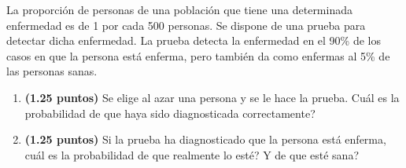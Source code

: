 
La proporción de personas de una población que tiene una determinada enfermedad es de 1 por cada 500 personas. Se dispone de una prueba para detectar dicha enfermedad. La prueba detecta la enfermedad en el 90\% de los casos en que la persona está enferma, pero también da como enfermas al 5\% de las personas sanas.
\begin{enumerate}[label=\alph*)]
\item \textbf{(1.25 puntos)} Se elige al azar una persona y se le hace la prueba. \textquestiondown{}Cuál es la probabilidad de que haya sido diagnosticada correctamente?
\item \textbf{(1.25 puntos)} Si la prueba ha diagnosticado que la persona está enferma, \textquestiondown{}cuál es la probabilidad de que realmente lo esté? \textquestiondown{}Y de que esté sana?
\end{enumerate}
